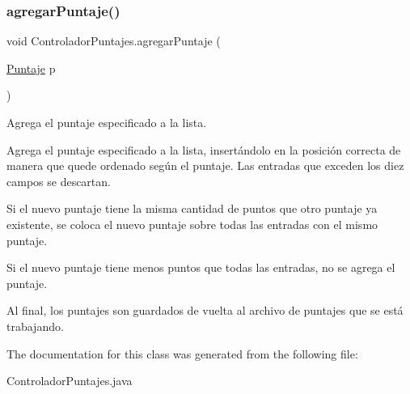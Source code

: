\subsubsection{\texorpdfstring{agregar\+Puntaje()}{agregarPuntaje()}}
{\footnotesize\ttfamily void Controlador\+Puntajes.\+agregar\+Puntaje (\begin{DoxyParamCaption}\item[{\mbox{\hyperlink{class_puntaje}{Puntaje}}}]{p }\end{DoxyParamCaption})}



Agrega el puntaje especificado a la lista. 

Agrega el puntaje especificado a la lista, insertándolo en la posición correcta de manera que quede ordenado según el puntaje. Las entradas que exceden los diez campos se descartan.

Si el nuevo puntaje tiene la misma cantidad de puntos que otro puntaje ya existente, se coloca el nuevo puntaje sobre todas las entradas con el mismo puntaje.

Si el nuevo puntaje tiene menos puntos que todas las entradas, no se agrega el puntaje.

Al final, los puntajes son guardados de vuelta al archivo de puntajes que se está trabajando. 

The documentation for this class was generated from the following file\+:\begin{DoxyCompactItemize}
\item 
Controlador\+Puntajes.\+java\end{DoxyCompactItemize}
